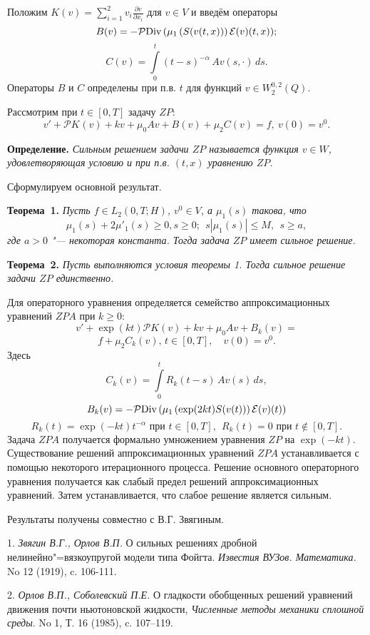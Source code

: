 Положим
$K(v)=\sum_{i=1}^2 v_i\frac{\partial v}{\partial x_i}$ для $v\in V$ и введём операторы
$$
B(v) = - {\mathcal{P}}{\rm Div} \, (\mu_1\,(S(v(t,x)))\,\mathcal{E}(v)(t,x));
$$
$$ C(v)=\int\limits_{0}^t(t-s)^{-\alpha}\,A v(s, \cdot )\,ds.
$$
Операторы $B$ и
$C$ определены при п.в. $t$ для функций $v\in W_2^{0,2}(Q)$.

Рассмотрим при $ t\in[0,T]$ задачу $ZP$:
$$
v'+\mathcal{P}K_{}( v)+ k v+\mu_0 Av +B(v)+\mu_2C(v)= f,\ v(0)=v^0.
$$


\textbf{Определение.} {\it
Сильным решением задачи $ZP$ называется функция $v\in W$, удовлетворяющая условию и при п.в. $(t,x)$ уравнению $ZP$.}

Сформулируем основной результат.

\textbf{Теорема~1.} {\it Пусть $f\in L_2 (0,T;H)$, $v^0\in V$, а $\mu_1(s)$ такова, что
$$
 \mu_1(s)+2\mu'_1(s)\ge 0, s\ge 0; \ \ s|\mu_1(s)|\le M,\ \ s\ge a,
$$
где $a>0$ "--- некоторая константа. Тогда задача $ZP$ имеет сильное решение.}


\textbf{Теорема~2.} {\it Пусть выполняются условия теоремы 1.
Тогда сильное решение задачи $ZP$ единственно.}

 Для операторного уравнения
определяется семейство аппроксимационных уравнений $ZPA$ при $k\ge 0$:
$$
v'+\exp(kt)\mathcal{P}K(v)+ k v+\mu_0 Av +B_k(v)=
$$
$$
f+\mu_2 C_k(v),\, t\in[0,T], \quad v(0)=v^0.
$$
Здесь
$$
C_k(v)=\int\limits_{0}^tR_k(t-s)\,A v(s)\,ds,
$$
$$
B_k(v) = - {\mathcal{P}}{\rm Div} \, (\mu_1\,(\exp(2kt)S(v(t)))\,\mathcal{E}(v)(t))
$$
$$
R_k(t)=\exp(-kt)t^{-\alpha} \mbox{ при } t\in[0,T],\ \ R_k(t)=0 \mbox{ при } t\notin[0,T].
$$
 Задача $ZPA$ получается формально умножением уравнения $ZP$ на $\exp(-kt)$.
 Существование
решений аппроксимационных уравнений $ZPA$ устанавливается с помощью
некоторого итерационного процесса. Решение основного операторного уравнения получается как
слабый предел решений аппроксимационных уравнений. Затем устанавливается, что слабое решение является сильным.




Результаты получены совместно с В.Г. Звягиным.



\litlist

1. {\it Звягин В.Г., Орлов В.П.} О сильных решениях дробной нелинейно"=вязкоупругой модели типа Фойгта. {\it Известия \newline ВУЗов. Математика.} No 12 (1919), c. 106-111.

2. {\it Орлов В.П., Соболевский П.Е.} О гладкости обоб\-щен\-ных решений уравнений движения почти ньютоновской \newline жидкости, {\it Численные методы механики сплошной среды}. \newline No 1, Т. 16 (1985), c. 107--119.
